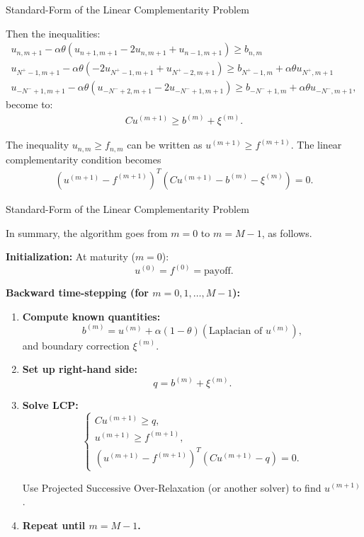 \documentclass{beamer}
\begin{document}
\begin{frame}{Standard-Form of the Linear Complementarity Problem}

    {\footnotesize \footnotesize
    Then the inequalities:
    \begin{gather*}
        u_{n,m+1} - \alpha \theta (u_{n+1,m+1} - 2u_{n,m+1} + u_{n-1,m+1}) \geq b_{n,m}\\
        u_{N^{+}-1,m+1} - \alpha \theta (-2u_{N^{+}-1,m+1} + u_{N^{+}-2,m+1}) 
        \geq b_{N^{+}-1,m} + \alpha \theta u_{N^{+},m+1}\\
        u_{-N^{-}+1,m+1} - \alpha \theta (u_{-N^{-}+2,m+1} -
         2u_{-N^{-}+1,m+1}) \geq b_{-N^{-}+1,m} + \alpha \theta u_{-N^{-},m+1},
    \end{gather*}
    become to:
    \begin{align*}
        Cu^{(m+1)} \geq b^{(m)} + \xi^{(m)}.
    \end{align*}
    \par  \pause The inequality $u_{n,m} \geq f_{n,m}$ can be written as $u^{(m+1)} \geq f^{(m+1)}$. 
    The linear complementarity condition becomes
    \begin{align*}
        \left(u^{(m+1)} - f^{(m+1)}\right)^T \left(Cu^{(m+1)} - b^{(m)} - \xi^{(m)}\right) = 0.
    \end{align*}
    }
    
    
\end{frame}
\begin{frame}{Standard-Form of the Linear Complementarity Problem}

    {\footnotesize \footnotesize
     In summary, the algorithm goes from $m = 0$ to $m = M - 1$, as follows. 

    \textbf{Initialization:} At maturity ($m = 0$):
    \[
    u^{(0)} = f^{(0)} = \text{payoff}.
    \]

     \pause \textbf{Backward time-stepping (for $m = 0, 1, \ldots, M - 1$):}
    \begin{enumerate}
    \item \textbf{Compute known quantities:}
    \[
    b^{(m)} = u^{(m)} + \alpha(1 - \theta)(\text{Laplacian of } u^{(m)}),
    \]
    and boundary correction $\xi^{(m)}$.

     \pause \item \textbf{Set up right-hand side:}
    \[
    q = b^{(m)} + \xi^{(m)}.
    \]

     \pause \item \textbf{Solve LCP:}
    \[
    \begin{cases}
    C u^{(m+1)} \geq q, \\
    u^{(m+1)} \geq f^{(m+1)}, \\
    (u^{(m+1)} - f^{(m+1)})^{T}(C u^{(m+1)} - q) = 0.
    \end{cases}
    \]
    \par  Use Projected Successive Over-Relaxation (or another solver) to find $u^{(m+1)}$.

    \item \textbf{Repeat until $m = M - 1$.}
    \end{enumerate}
    

    }
    
    
\end{frame}
\end{document}

